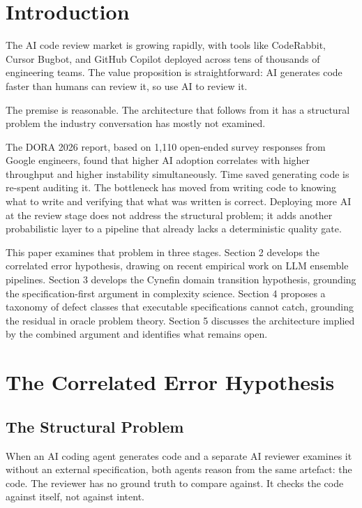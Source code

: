 \documentclass{article}
\begin{document}
\section{Introduction}

The AI code review market is growing rapidly, with tools like CodeRabbit,
Cursor Bugbot, and GitHub Copilot deployed across tens
of thousands of engineering teams. The value proposition is
straightforward: AI generates code faster than humans can review it, so
use AI to review it.

The premise is reasonable. The architecture that follows from it has a
structural problem the industry conversation has mostly not examined.

The DORA 2026 report, based on 1,110 open-ended survey responses from Google engineers,
found that higher AI adoption correlates with higher throughput and higher
instability simultaneously. Time saved generating code is re-spent
auditing it. The bottleneck has moved from writing code to knowing what
to write and verifying that what was written is correct. Deploying more AI
at the review stage does not address the structural problem; it adds
another probabilistic layer to a pipeline that already lacks a
deterministic quality gate.

This paper examines that problem in three stages. Section 2 develops the
correlated error hypothesis, drawing on recent empirical work on LLM
ensemble pipelines. Section 3 develops the Cynefin domain transition
hypothesis, grounding the specification-first argument in complexity
science. Section 4 proposes a taxonomy of defect classes that executable
specifications cannot catch, grounding the residual in oracle problem
theory. Section 5 discusses the architecture implied by the combined
argument and identifies what remains open.


\section{The Correlated Error Hypothesis}

\subsection{The Structural Problem}

When an AI coding agent generates code and a separate AI reviewer examines
it without an external specification, both agents reason from the same
artefact: the code. The reviewer has no ground truth to compare against.
It checks the code against itself, not against intent.
\end{document}
